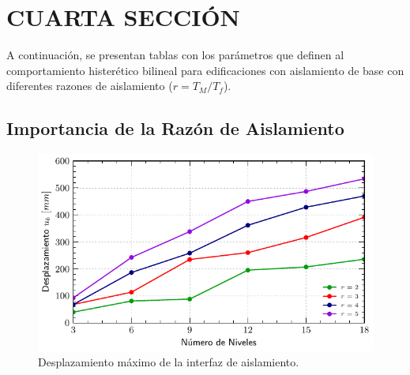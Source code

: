 \section{CUARTA SECCIÓN}

\lipsum[20]

A continuación, se presentan tablas con los parámetros que definen al comportamiento histerético bilineal para edificaciones con aislamiento de base con diferentes razones de aislamiento ($r=T_{M}/T_{f}$). 



	\subsection{Importancia de la Razón de Aislamiento}
	
	\lipsum[29]
	
	\begin{figure}[!h]
	\centering
		\includegraphics[scale=1]{E_IMAGENES/2_Capitulo3/Cap3_Imagen9.pdf}
		\vspace{-3 mm}
	\caption[Desplazamiento máximo de la interfaz de aislamiento]{\centering\footnotesize Desplazamiento máximo de la interfaz de aislamiento.}
	\label{Cap3_Figura9}
	\end{figure}

